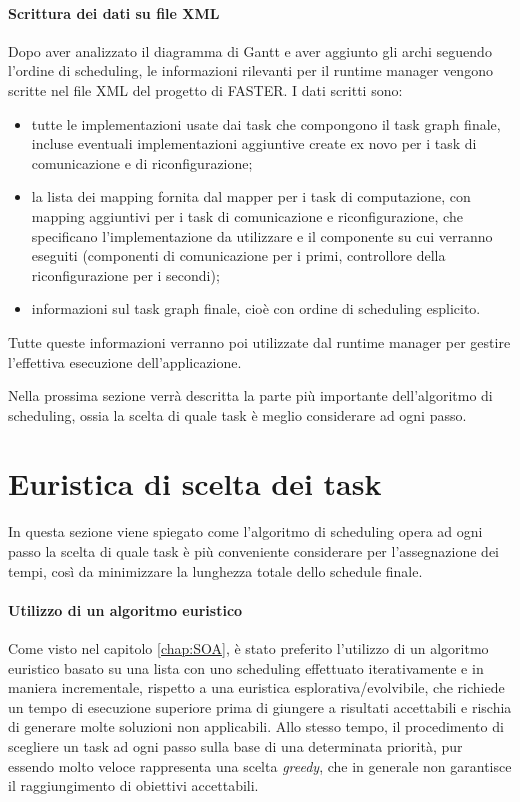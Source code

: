 \paragraph{Scrittura dei dati su file XML}
Dopo aver analizzato il diagramma di Gantt e aver aggiunto gli archi seguendo 
l'ordine di scheduling, le informazioni rilevanti per il runtime manager 
vengono scritte nel file XML del progetto di \ac{FASTER}. I dati scritti sono:
\begin{itemize}
 \item tutte le implementazioni usate dai task che compongono il task graph 
finale, incluse eventuali implementazioni aggiuntive create ex novo per i task di 
comunicazione e di riconfigurazione;
 \item la lista dei mapping fornita dal mapper per i task di computazione, con 
mapping aggiuntivi per i task di comunicazione e riconfigurazione, che 
specificano l'implementazione da utilizzare e il componente su cui verranno 
eseguiti (componenti di comunicazione per i primi, controllore della 
riconfigurazione per i secondi);
 \item informazioni sul task graph finale, cioè con ordine di scheduling 
esplicito.
\end{itemize}

Tutte queste informazioni verranno poi utilizzate dal runtime manager per 
gestire l'effettiva esecuzione dell'applicazione.

Nella prossima sezione verrà descritta la parte più importante dell'algoritmo 
di scheduling, ossia la scelta di quale task è meglio considerare ad ogni 
passo.


\section{Euristica di scelta dei task}
\label{sec:euristicaSceltaTask}
In questa sezione viene spiegato come l'algoritmo di scheduling opera ad ogni 
passo la scelta di quale task è più conveniente considerare per l'assegnazione 
dei tempi, così da minimizzare la lunghezza totale dello schedule finale.

\paragraph{Utilizzo di un algoritmo euristico}
Come visto nel capitolo \ref{chap:SOA}, è stato preferito l'utilizzo di un 
algoritmo euristico basato su una lista con uno scheduling effettuato 
iterativamente e in maniera incrementale, rispetto a una euristica 
esplorativa/evolvibile, che richiede un tempo di esecuzione superiore prima di 
giungere a risultati accettabili e rischia di generare molte soluzioni non 
applicabili. Allo stesso tempo, il procedimento di scegliere un task ad ogni 
passo sulla base di una determinata priorità, pur essendo molto veloce 
rappresenta una scelta \emph{greedy}, che in generale non garantisce il 
raggiungimento di obiettivi accettabili.

